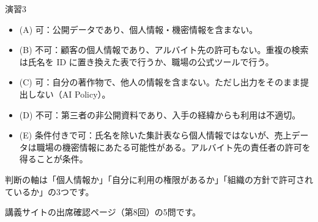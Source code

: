 \begin{answer}{演習3}
\begin{itemize}
  \item (A) 可：公開データであり、個人情報・機密情報を含まない。
  \item (B) 不可：顧客の個人情報であり、アルバイト先の許可もない。重複の検索は氏名を ID に置き換えた表で行うか、職場の公式ツールで行う。
  \item (C) 可：自分の著作物で、他人の情報を含まない。ただし出力をそのまま提出しない（AI Policy）。
  \item (D) 不可：第三者の非公開資料であり、入手の経緯からも利用は不適切。
  \item (E) 条件付きで可：氏名を除いた集計表なら個人情報ではないが、売上データは職場の機密情報にあたる可能性がある。アルバイト先の責任者の許可を得ることが条件。
\end{itemize}
判断の軸は「個人情報か」「自分に利用の権限があるか」「組織の方針で許可されているか」の3つです。
\end{answer}

講義サイトの出席確認ページ（第8回）の5問です。

